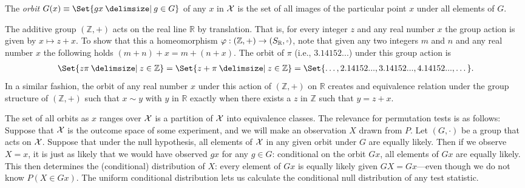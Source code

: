 \begin{definition}
The \emph{orbit} $G(x) \equiv \Set{gx  \given g \in G}$ of any $x$ in $\mathcal{X}$ is
the set of all images of the particular point $x$ under all elements of $G$.
\end{definition}


\begin{example}
The additive group $(\mathbb{Z}, +)$ acts on the real line $\mathbb{R}$ by translation.
That is, for every integer $z$ and any real number $x$ the group action is given
by $x \mapsto z + x$. To show that this a homeomorphism $\varphi : (\mathbb{Z}, +) \to (S_\mathbb{R}, \smallcirc)$,
note that given any two integers $m$ and $n$ and any real number $x$ the following
holds $(m + n) + x = m + (n + x)$.  The orbit of $\pi$ (i.e., $3.14152...$) under
this group action is
\begin{align*}
\Set{z\pi  \given z \in \mathbb{Z}} = \Set{z + \pi  \given z \in \mathbb{Z}} =\Set{\dots, 2.14152..., 3.14152..., 4.14152..., \dots}.
\end{align*}
In a similar fashion, the orbit of any real number $x$ under this action of $(\mathbb{Z}, +)$
on $\mathbb{R}$ creates and equivalence relation under the group structure of $(\mathbb{Z}, +)$ such
that $x \sim y$ with $y$ in $\mathbb{R}$ exactly when there exists a $z$ in $\mathbb{Z}$ such that
$y = z + x$.
\end{example}

The set of all orbits as $x$ ranges over $\mathcal{X}$ is a partition of $\mathcal{X}$ into equivalence classes.
The relevance for permutation tests is as follows: Suppose that $\mathcal{X}$ is the outcome
space of some experiment, and we will make an observation $X$ drawn from $P$.
Let $(G, \cdot)$ be a group that acts on $\mathcal{X}$.
Suppose that under the null hypothesis, all elements of $\mathcal{X}$ in any given orbit under $G$ 
are equally likely.
Then if we observe $X=x$, it is just as likely that we would have observed $gx$ for any
$g \in G$: conditional on the orbit $Gx$, all elements of $Gx$ are equally likely.
This then determines the (conditional) distribution of $X$: every element of $Gx$ is equally
likely given $GX = Gx$---even though we do not know $P(X \in Gx)$.
The uniform conditional distribution lets us calculate the conditional null distribution of
any test statistic.

